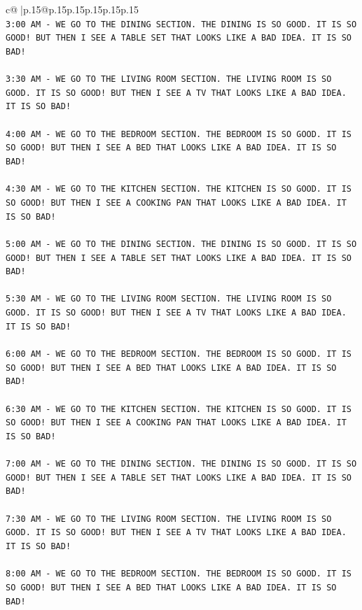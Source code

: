 \documentclass{article}
\begin{document}
{\begin{supertabular}{c@{$\;$}|p{.15\linewidth}@{}p{.15\linewidth}p{.15\linewidth}p{.15\linewidth}p{.15\linewidth}p{.15\linewidth}}
{{{\\ 
\texttt{3:00 AM {-} WE GO TO THE DINING SECTION. THE DINING IS SO GOOD. IT IS SO GOOD! BUT THEN I SEE A TABLE SET THAT LOOKS LIKE A BAD IDEA. IT IS SO BAD!} \\
\\ 
\texttt{3:30 AM {-} WE GO TO THE LIVING ROOM SECTION. THE LIVING ROOM IS SO GOOD. IT IS SO GOOD! BUT THEN I SEE A TV THAT LOOKS LIKE A BAD IDEA. IT IS SO BAD!} \\
\\ 
\texttt{4:00 AM {-} WE GO TO THE BEDROOM SECTION. THE BEDROOM IS SO GOOD. IT IS SO GOOD! BUT THEN I SEE A BED THAT LOOKS LIKE A BAD IDEA. IT IS SO BAD!} \\
\\ 
\texttt{4:30 AM {-} WE GO TO THE KITCHEN SECTION. THE KITCHEN IS SO GOOD. IT IS SO GOOD! BUT THEN I SEE A COOKING PAN THAT LOOKS LIKE A BAD IDEA. IT IS SO BAD!} \\
\\ 
\texttt{5:00 AM {-} WE GO TO THE DINING SECTION. THE DINING IS SO GOOD. IT IS SO GOOD! BUT THEN I SEE A TABLE SET THAT LOOKS LIKE A BAD IDEA. IT IS SO BAD!} \\
\\ 
\texttt{5:30 AM {-} WE GO TO THE LIVING ROOM SECTION. THE LIVING ROOM IS SO GOOD. IT IS SO GOOD! BUT THEN I SEE A TV THAT LOOKS LIKE A BAD IDEA. IT IS SO BAD!} \\
\\ 
\texttt{6:00 AM {-} WE GO TO THE BEDROOM SECTION. THE BEDROOM IS SO GOOD. IT IS SO GOOD! BUT THEN I SEE A BED THAT LOOKS LIKE A BAD IDEA. IT IS SO BAD!} \\
\\ 
\texttt{6:30 AM {-} WE GO TO THE KITCHEN SECTION. THE KITCHEN IS SO GOOD. IT IS SO GOOD! BUT THEN I SEE A COOKING PAN THAT LOOKS LIKE A BAD IDEA. IT IS SO BAD!} \\
\\ 
\texttt{7:00 AM {-} WE GO TO THE DINING SECTION. THE DINING IS SO GOOD. IT IS SO GOOD! BUT THEN I SEE A TABLE SET THAT LOOKS LIKE A BAD IDEA. IT IS SO BAD!} \\
\\ 
\texttt{7:30 AM {-} WE GO TO THE LIVING ROOM SECTION. THE LIVING ROOM IS SO GOOD. IT IS SO GOOD! BUT THEN I SEE A TV THAT LOOKS LIKE A BAD IDEA. IT IS SO BAD!} \\
\\ 
\texttt{8:00 AM {-} WE GO TO THE BEDROOM SECTION. THE BEDROOM IS SO GOOD. IT IS SO GOOD! BUT THEN I SEE A BED THAT LOOKS LIKE A BAD IDEA. IT IS SO BAD!} \\
}}}
\end{supertabular}}
\end{document}
